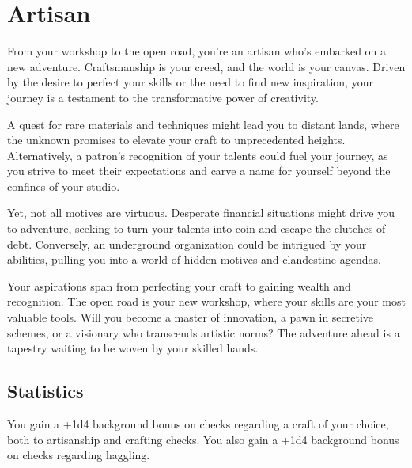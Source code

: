 \section{Artisan}\label{background:artisan}
From your workshop to the open road, you're an artisan who's embarked on a new adventure.
Craftsmanship is your creed, and the world is your canvas.
Driven by the desire to perfect your skills or the need to find new inspiration, your journey is a testament to the transformative power of creativity.

A quest for rare materials and techniques might lead you to distant lands, where the unknown promises to elevate your craft to unprecedented heights.
Alternatively, a patron's recognition of your talents could fuel your journey, as you strive to meet their expectations and carve a name for yourself beyond the confines of your studio.

Yet, not all motives are virtuous.
Desperate financial situations might drive you to adventure, seeking to turn your talents into coin and escape the clutches of debt.
Conversely, an underground organization could be intrigued by your abilities, pulling you into a world of hidden motives and clandestine agendas.

Your aspirations span from perfecting your craft to gaining wealth and recognition.
The open road is your new workshop, where your skills are your most valuable tools.
Will you become a master of innovation, a pawn in secretive schemes, or a visionary who transcends artistic norms?
The adventure ahead is a tapestry waiting to be woven by your skilled hands.

\subsection{Statistics}
You gain a +1d4 background bonus on checks regarding a craft of your choice, both to artisanship and crafting checks.
You also gain a +1d4 background bonus on checks regarding haggling.
